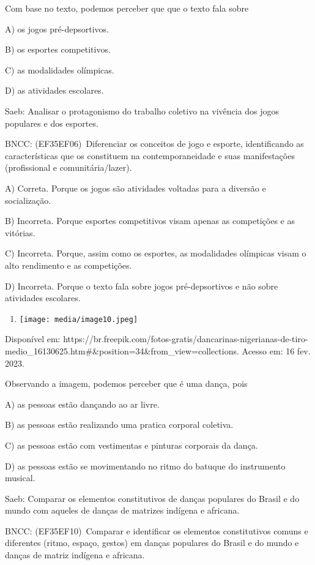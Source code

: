 Com base no texto, podemos perceber que que o texto fala sobre

A) os jogos pré-depsortivos.

B) os esportes competitivos.

C) as modalidades olímpicas.

D) as atividades escolares.

Saeb: Analisar o protagonismo do trabalho coletivo na vivência dos jogos
populares e dos esportes.

BNCC: (EF35EF06)~Diferenciar os conceitos de jogo e esporte,
identificando as características que os constituem na contemporaneidade
e suas manifestações (profissional e comunitária/lazer).

A) Correta. Porque os jogos são atividades voltadas para a diversão e
socialização.

B) Incorreta. Porque esportes competitivos visam apenas as competições e
as vitórias.

C) Incorreta. Porque, assim como os esportes, as modalidades olímpicas
visam o alto rendimento e as competições.

D) Incorreta. Porque o texto fala sobre jogos pré-depsortivos e não
sobre atividades escolares.

\begin{enumerate}
\def\labelenumi{\arabic{enumi}.}
\item
  \texttt{[image: media/image10.jpeg]}
\end{enumerate}

Disponível em:
https://br.freepik.com/fotos-gratis/dancarinas-nigerianas-de-tiro-medio\_16130625.htm\#\&position=34\&from\_view=collections.
Acesso em: 16 fev. 2023.

Observando a imagem, podemos perceber que é uma dança, pois

A) as pessoas estão dançando ao ar livre.

B) as pessoas estão realizando uma pratica corporal coletiva.

C) as pessoas estão com vestimentas e pinturas corporais da dança.

D) as pessoas estão se movimentando no ritmo do batuque do instrumento
musical.

Saeb: Comparar os elementos constitutivos de danças populares do Brasil
e do mundo com aqueles de danças de matrizes indígena e africana.

BNCC: (EF35EF10)~Comparar e identificar os elementos constitutivos
comuns e diferentes (ritmo, espaço, gestos) em danças populares do
Brasil e do mundo e danças de matriz indígena e africana.

